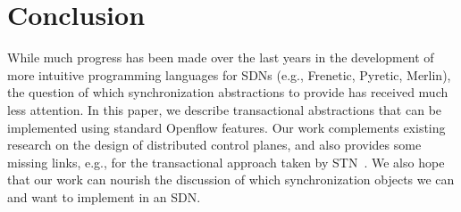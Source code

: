 \documentclass[conference]{sigcomm-alternate}
\begin{document}
\section{Conclusion}\label{sec:conclusion}

While much progress has been made over the
last years in the development of more intuitive programming
languages for SDNs (e.g., Frenetic, Pyretic, Merlin), the
question of which synchronization abstractions to provide
has received much less attention.
%
In this paper, we describe transactional abstractions that 
can be implemented using standard Openflow features.
%
Our work complements existing research on the design of
distributed control planes, and also provides some missing links,
e.g., for the transactional approach taken by STN~\cite{stn}.
We also hope that our work can nourish the discussion of
which synchronization objects we can and want to implement
in an SDN. 


{

}
\end{document}
